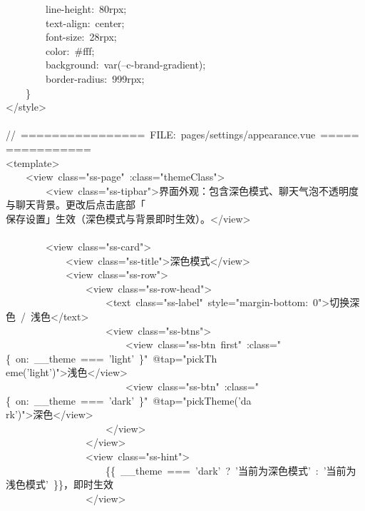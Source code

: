 \documentclass[a4paper,10pt]{article}
\begin{document}
\newpage

{\ttfamily\footnotesize\raggedright
~~~~~~~~line-height:~80rpx;\\
~~~~~~~~text-align:~center;\\
~~~~~~~~font-size:~28rpx;\\
~~~~~~~~color:~\#fff;\\
~~~~~~~~background:~var(--c-brand-gradient);\\
~~~~~~~~border-radius:~999rpx;\\
~~~~\}\\
</style>\\
\mbox{}\\
//~================~FILE:~pages/settings/appearance.vue~================\\
<template>\\
~~~~<view~class="ss-page"~:class="themeClass">\\
~~~~~~~~<view~class="ss-tipbar">界面外观：包含深色模式、聊天气泡不透明度与聊天背景。更改后点击底部「\\
保存设置」生效（深色模式与背景即时生效）。</view>\\
\mbox{}\\
~~~~~~~~<view~class="ss-card">\\
~~~~~~~~~~~~<view~class="ss-title">深色模式</view>\\
~~~~~~~~~~~~<view~class="ss-row">\\
~~~~~~~~~~~~~~~~<view~class="ss-row-head">\\
~~~~~~~~~~~~~~~~~~~~<text~class="ss-label"~style="margin-bottom:~0">切换深色~/~浅色</text>\\
~~~~~~~~~~~~~~~~~~~~<view~class="ss-btns">\\
~~~~~~~~~~~~~~~~~~~~~~~~<view~class="ss-btn~first"~:class="\{~on:~\_\_theme~===~'light'~\}"~@tap="pickTh\\
eme('light')">浅色</view>\\
~~~~~~~~~~~~~~~~~~~~~~~~<view~class="ss-btn"~:class="\{~on:~\_\_theme~===~'dark'~\}"~@tap="pickTheme('da\\
rk')">深色</view>\\
~~~~~~~~~~~~~~~~~~~~</view>\\
~~~~~~~~~~~~~~~~</view>\\
~~~~~~~~~~~~~~~~<view~class="ss-hint">\\
~~~~~~~~~~~~~~~~~~~~\{\{~\_\_theme~===~'dark'~?~'当前为深色模式'~:~'当前为浅色模式'~\}\}，即时生效\\
~~~~~~~~~~~~~~~~</view>\\
}
\end{document}
